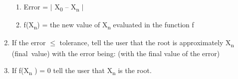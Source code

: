 \documentclass[12pt]{article}
\renewcommand{\_}{\kern-1.5pt\textunderscore\kern-1.5pt}
\begin{document}
\begin{enumerate}
\begin{enumerate}
	\item Error = $ \vert $  X\textsubscript{0 }– X\textsubscript{n }$ \vert $ \par

	\item f(X\textsubscript{n}) = the new value of X\textsubscript{n} evaluated in the function f \par


\end{enumerate}
	\item If the error $ \leq $  tolerance, tell the user that the root is approximately X\textsubscript{n }(final\ value) with the error being: \_\_\_\_\_ (with the final value of the error)\par

	\item If f(X\textsubscript{n }) = 0 tell the user that X\textsubscript{n }is the root. 
\end{enumerate}\par


\vspace{\baselineskip}

\printbibliography
\end{document}
